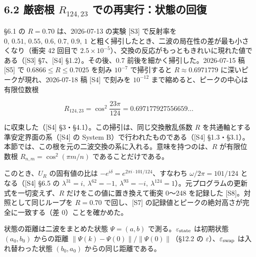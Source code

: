 \documentclass[
  a4paper,
]{ltjsarticle}
\begin{document}
\subsection{\texorpdfstring{6.2 厳密根 \(R_{124,23}\)
での再実行：状態の回復}{6.2 厳密根 R\_\{124,23\} での再実行：状態の回復}}\label{ux53b3ux5bc6ux6839-r_12423-ux3067ux306eux518dux5b9fux884cux72b6ux614bux306eux56deux5fa9}

§6.1 の \(R=0.70\) は、2026-07-13 の実験 {[}S3{]} で反射率を
\(0,\,0.51,\,0.55,\,0.6,\,0.7,\,0.9,\,1\)
と粗く掃引したとき、二波の局在性の差が最も小さくなり（衝突 42 回目で
\(2.5\times10^{-5}\)）、交換の反応がもっともきれいに現れた値である（{[}S3{]}
§7、{[}S4{]} §1.2）。その後、0.7 前後を細かく掃引した。2026-07-15 稿
{[}S5{]} で \(0.6866\le R\le0.7025\) を刻み \(10^{-7}\) で掃引すると
\(R\approx0.6971779\) に深いピークが現れ、2026-07-18 稿 {[}S4{]}
で刻みを \(10^{-12}\) まで縮めると、ピークの中心は有限位数根

\[
R_{124,23}=\cos^2\frac{23\pi}{124}=0.697177927556659\ldots
\]

に収束した（{[}S4{]} §3・§4.1）。この掃引は、同じ交換散乱係数 \(R\)
を共通軸とする準安定界面の系（{[}S4{]} の System
B）で行われたものである（{[}S4{]}
§1.3・§3.1）。本節では、この根を元の二波交換の系に入れる。意味を持つのは、\(R\)
が有限位数根 \(R_{n,m}=\cos^2(\pi m/n)\) であることだけである。

このとき、\(U_R\) の固有値の比は
\(-e^{i\delta}=e^{2\pi i\cdot101/124}\)、すなわち
\(\omega/2\pi=101/124\) となる（{[}S4{]} §6.5 の
\(\lambda^{31}=i,\ \lambda^{62}=-1,\ \lambda^{93}=-i,\ \lambda^{124}=1\)）。元プログラムの更新式を一切変えず、\(R\)
だけをこの値に置き換えて衝突 0〜248 を記録した
{[}S8{]}。対照として同じループを \(R=0.70\) で回し、{[}S7{]}
の記録値とピークの絶対高さが完全に一致する（差 0）ことを確かめた。

状態の距離は二波をまとめた状態 \(\Psi=(a,b)\)
で測る。\(\varepsilon_{\rm state}\) は初期状態 \((a_0,b_0)\) からの距離
\(\|\Psi(k)-\Psi(0)\|/\|\Psi(0)\|\)（§12.2 の
\(\varepsilon\)）、\(\varepsilon_{\rm swap}\) は入れ替わった状態
\((b_0,a_0)\) からの同じ距離である。
\end{document}
